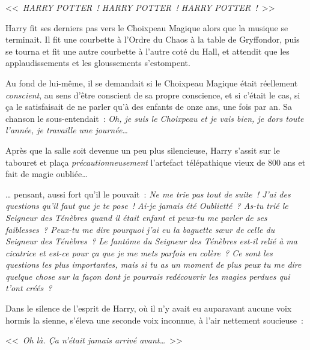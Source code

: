 <<~\emph{HARRY POTTER~! HARRY POTTER~! HARRY POTTER~!}~>>

Harry fit ses derniers pas vers le Choixpeau Magique alors que la musique se terminait. Il fit une courbette à l'Ordre du Chaos à la table de Gryffondor, puis se tourna et fit une autre courbette à l'autre coté du Hall, et attendit que les applaudissements et les gloussements s'estompent.

Au fond de lui-même, il se demandait si le Choixpeau Magique était réellement \emph{conscient}, au sens d'être conscient de sa propre conscience, et si c'était le cas, si ça le satisfaisait de ne parler qu'à des enfants de onze ans, une fois par an. Sa chanson le sous-entendait~: \emph{Oh, je suis le Choixpeau et je vais bien, je dors toute l'année, je travaille une journée…}

Après que la salle soit devenue un peu plus silencieuse, Harry s'assit sur le tabouret et plaça \emph{précautionneusement} l'artefact télépathique vieux de 800 ans et fait de magie oubliée…

… pensant, aussi fort qu'il le pouvait~: \emph{Ne me trie pas tout de suite~! J'ai des questions qu'il faut que je te pose~! Ai-je jamais été Oublietté~? As-tu trié le Seigneur des Ténèbres quand il était enfant et peux-tu me parler de ses faiblesses~? Peux-tu me dire pourquoi j'ai eu la baguette sœur de celle du Seigneur des Ténèbres~? Le fantôme du Seigneur des Ténèbres est-il relié à ma cicatrice et est-ce pour ça que je me mets parfois en colère~? Ce sont les questions les plus importantes, mais si tu as un moment de plus peux tu me dire quelque chose sur la façon dont je pourrais redécouvrir les magies perdues qui t'ont créés~?}

Dans le silence de l'esprit de Harry, où il n'y avait eu auparavant aucune voix hormis la sienne, s'éleva une seconde voix inconnue, à l'air nettement soucieuse~:

<<~\emph{Oh là. Ça n'était jamais arrivé avant…}~>> 

